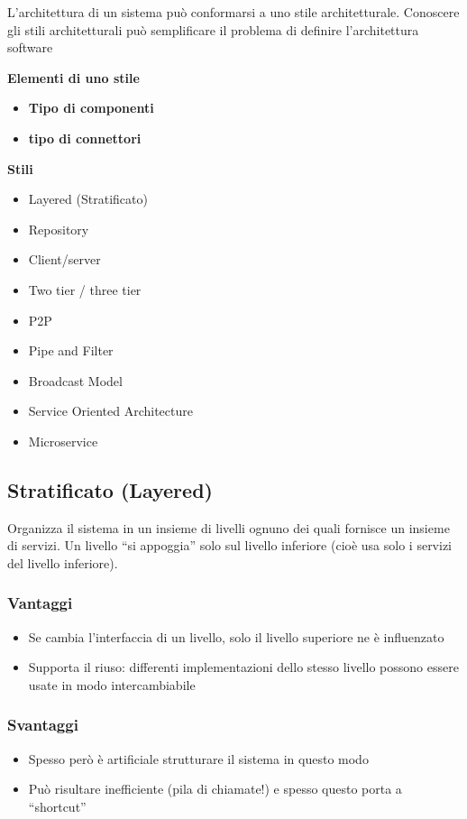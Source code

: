 L’architettura di un sistema può conformarsi a uno stile architetturale. Conoscere gli stili architetturali può semplificare il problema di definire l’architettura software

\vspace{2mm}

\noindent \textbf{Elementi di uno stile}
\begin{itemize}
    \item \textbf{Tipo di componenti}
    \item \textbf{tipo di connettori}
\end{itemize}

\noindent \textbf{Stili}
\begin{itemize}
    \item Layered (Stratificato)
    \item Repository
    \item Client/server
    \item Two tier / three tier
    \item P2P
    \item Pipe and Filter
    \item Broadcast Model
    \item Service Oriented Architecture
    \item Microservice
\end{itemize}

\break
\subsection{Stratificato (Layered)}
Organizza il sistema in un insieme di livelli ognuno dei quali fornisce un insieme di servizi. Un livello “si appoggia” solo sul livello inferiore (cioè usa solo i servizi del livello inferiore).

\subsubsection{Vantaggi}
\begin{itemize}
    \item Se cambia l’interfaccia di un livello, solo il livello superiore ne è influenzato
    \item Supporta il riuso: differenti implementazioni dello stesso livello possono essere usate in modo intercambiabile
\end{itemize}

\subsubsection{Svantaggi}
\begin{itemize}
    \item Spesso però è artificiale strutturare il sistema in questo modo
    \item Può risultare inefficiente (pila di chiamate!) e spesso questo porta a “shortcut”
\end{itemize}


